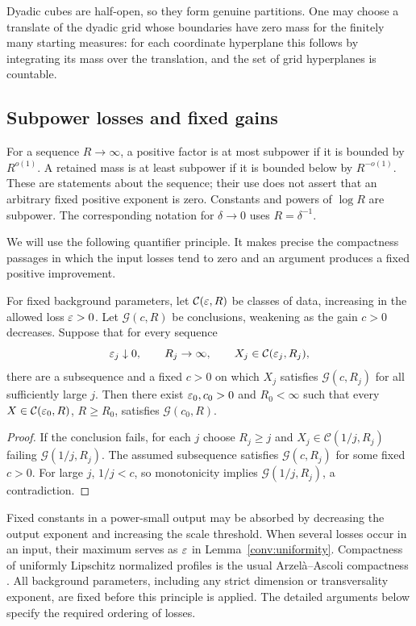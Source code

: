 Dyadic cubes are half-open, so they form genuine partitions.
One may choose a translate of the dyadic grid whose boundaries have zero
mass for the finitely many starting measures: for each coordinate
hyperplane this follows by integrating its mass over the translation,
and the set of grid hyperplanes is countable.

\subsection{Subpower losses and fixed gains}

For a sequence \(R\to\infty\), a positive factor is at most subpower if it
is bounded by \(R^{o(1)}\). A retained mass is at least subpower if it is
bounded below by \(R^{-o(1)}\). These are statements about the sequence;
their use does not assert that an arbitrary fixed positive exponent is
zero. Constants and powers of \(\log R\) are subpower.
The corresponding notation for \(\delta\to0\) uses \(R=\delta^{-1}\).

We will use the following quantifier principle. It makes precise the
compactness passages in which the input losses tend to zero and an
argument produces a fixed positive improvement.

\begin{lemma}\label{conv:uniformity}
For fixed background parameters, let \(\mathcal C(\varepsilon,R)\) be classes
of data, increasing in the allowed loss \(\varepsilon>0\).
Let \(\mathcal G(c,R)\) be conclusions, weakening as the gain
\(c>0\) decreases. Suppose that for every sequence
\[
 \varepsilon_j\downarrow0,\qquad R_j\to\infty,\qquad
 X_j\in\mathcal C(\varepsilon_j,R_j),
\]
there are a subsequence and a fixed \(c>0\) on which
\(X_j\) satisfies \(\mathcal G(c,R_j)\) for all sufficiently large \(j\).
Then there exist \(\varepsilon_0,c_0>0\) and \(R_0<\infty\) such that
every \(X\in\mathcal C(\varepsilon_0,R)\), \(R\ge R_0\), satisfies
\(\mathcal G(c_0,R)\).
\end{lemma}

\begin{proof}
If the conclusion fails, for each \(j\) choose \(R_j\ge j\) and
\(X_j\in\mathcal C(1/j,R_j)\) failing \(\mathcal G(1/j,R_j)\).
The assumed subsequence satisfies \(\mathcal G(c,R_j)\) for some fixed
\(c>0\). For large \(j\), \(1/j<c\), so monotonicity implies
\(\mathcal G(1/j,R_j)\), a contradiction.
\end{proof}

Fixed constants in a power-small output may be absorbed by decreasing the
output exponent and increasing the scale threshold. When several losses
occur in an input, their maximum serves as \(\varepsilon\) in
Lemma~\ref{conv:uniformity}. Compactness of uniformly Lipschitz normalized
profiles is the usual Arzel\`a--Ascoli compactness
\cite[Theorem~4.43]{Folland1999}.
All background parameters, including any strict dimension or
transversality exponent, are fixed before this principle is applied.
The detailed arguments below specify the required ordering of losses.

